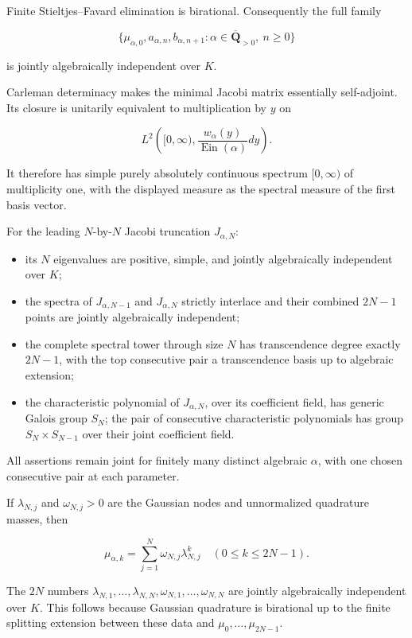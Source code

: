 \documentclass[11pt]{article}
\theoremstyle{keio}
\theoremstyle{definition}
\theoremstyle{remark}
\newcommand{\Ein}{\operatorname{Ein}}
\providecommand{\tightlist}{\setlength{\itemsep}{0pt}\setlength{\parskip}{0pt}}
\begin{document}
Finite Stieltjes--Favard elimination is birational. Consequently the full
family

\[
\{\mu_{\alpha,0},a_{\alpha,n},b_{\alpha,n+1}:
\alpha\in\overline{\mathbf Q}_{>0},\ n\ge0\}
\]

is jointly algebraically independent over \(K\).

Carleman determinacy makes the minimal Jacobi matrix essentially
self-adjoint. Its closure is unitarily equivalent to multiplication by \(y\)
on

\[
L^2\!\left([0,\infty),\frac{w_\alpha(y)}{\Ein(\alpha)}dy\right).
\]

It therefore has simple purely absolutely continuous spectrum \([0,\infty)\)
of multiplicity one, with the displayed measure as the spectral measure of
the first basis vector.

For the leading \(N\)-by-\(N\) Jacobi truncation \(J_{\alpha,N}\):

\begin{itemize}
\tightlist
\item
  its \(N\) eigenvalues are positive, simple, and jointly algebraically
  independent over \(K\);
\item
  the spectra of \(J_{\alpha,N-1}\) and \(J_{\alpha,N}\) strictly interlace
  and their combined \(2N-1\) points are jointly algebraically independent;
\item
  the complete spectral tower through size \(N\) has transcendence degree
  exactly \(2N-1\), with the top consecutive pair a transcendence basis up
  to algebraic extension;
\item
  the characteristic polynomial of \(J_{\alpha,N}\), over its coefficient
  field, has generic Galois group \(S_N\); the pair of consecutive
  characteristic polynomials has group \(S_N\times S_{N-1}\) over their
  joint coefficient field.
\end{itemize}

All assertions remain joint for finitely many distinct algebraic \(\alpha\),
with one chosen consecutive pair at each parameter.

If \(\lambda_{N,j}\) and \(\omega_{N,j}>0\) are the Gaussian nodes and
unnormalized quadrature masses, then

\[
\mu_{\alpha,k}=\sum_{j=1}^N\omega_{N,j}\lambda_{N,j}^k
\quad(0\le k\le2N-1).
\]

The \(2N\) numbers \(\lambda_{N,1},\ldots,\lambda_{N,N}, \omega_{N,1},\ldots,\omega_{N,N}\) are jointly algebraically independent
over \(K\). This follows because Gaussian quadrature is birational up to the
finite splitting extension between these data and
\(\mu_0,\ldots,\mu_{2N-1}\).
\end{document}
